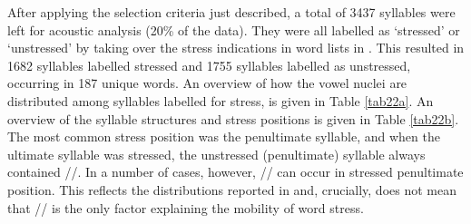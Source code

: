 \begin{table}
\caption{Counts of syllables labelled as stressed and unstressed in different syllable structures. In italic: absolute standardised residuals for each of the two chi-square tests described in Section \ref{sec223}. For readability purposes the position of the syllable in the word is indicated (pre-final/final).}
\label{tab22b}
\end{table}



After applying the selection criteria just described, a total of 3437 syllables were left for acoustic analysis (20\% of the data). They were all labelled as `stressed' or `unstressed' by taking over the stress indications in word lists in \citet{kluge_grammar_2017}. This resulted in 1682 syllables labelled stressed and 1755 syllables labelled as unstressed, occurring in 187 unique words. An overview of how the vowel nuclei are distributed among syllables labelled for stress, is given in Table \ref{tab22a}. An overview of the syllable structures and stress positions is given in Table \ref{tab22b}. The most common stress position was the penultimate syllable, and when the ultimate syllable was stressed, the unstressed (penultimate) syllable always contained //. In a number of cases, however, // can occur in stressed penultimate position. This reflects the distributions reported in \citet{kluge_grammar_2017} and, crucially, does not mean that // is the only factor explaining the mobility of word stress.\par

